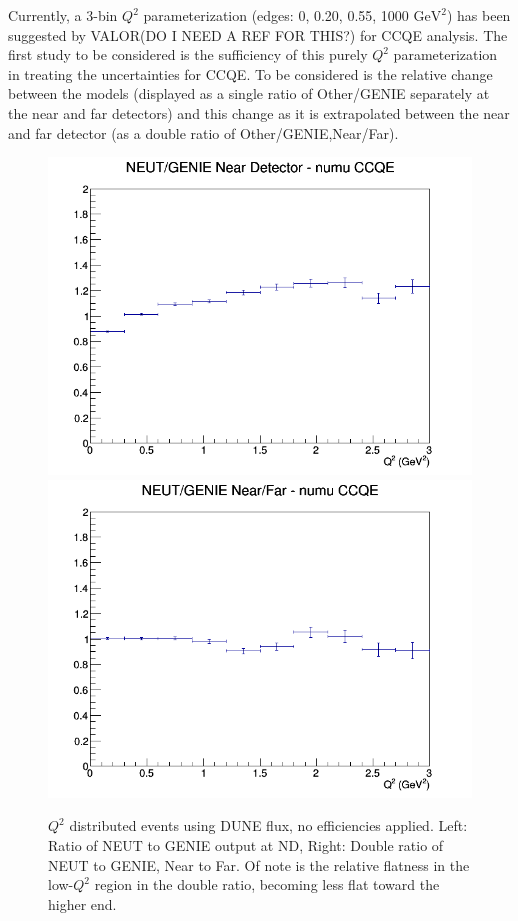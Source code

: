 \documentclass[12pt]{article}
\begin{document}
Currently, a 3-bin $Q^2$ parameterization (edges: {0, 0.20, 0.55, 1000} $\textrm{GeV}^2$) has been suggested by VALOR(DO I NEED A REF FOR THIS?) for CCQE analysis. The first study to be considered is the sufficiency of this purely $Q^2$ parameterization in treating the uncertainties for CCQE. To be considered is the relative change between the models (displayed as a single ratio of Other/GENIE separately at the near and far detectors) and this change as it is extrapolated between the near and far detector (as a double ratio of Other/GENIE,Near/Far).
\begin{figure}[h]
\includegraphics[width=\linewidth]{Q2/nominal/ratios/CCQE_NEUT_GENIE_numu_near_Q2.png}
\endminipage
{}
\includegraphics[width=\linewidth]{Q2/nominal/ratios/CCQE_NEUT_GENIE_numu_NF_Q2.png}
\endminipage
\caption{$Q^2$ distributed events using DUNE flux, no efficiencies applied. Left: Ratio of NEUT to GENIE output at ND, Right: Double ratio of NEUT to GENIE, Near to Far. Of note is the relative flatness in the low-$Q^2$ region in the double ratio, becoming less flat toward the higher end.}
\end{figure}
\end{document}

